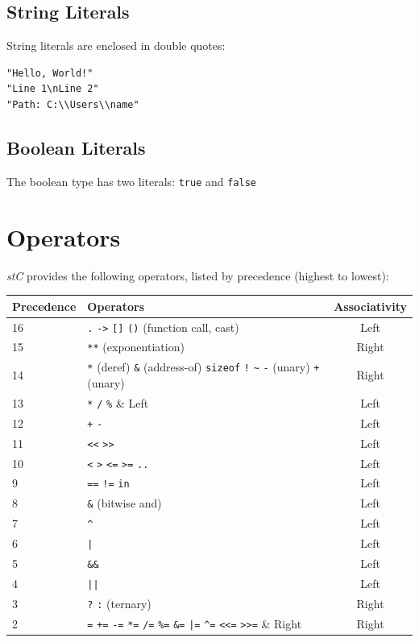 \documentclass[11pt,letterpaper,twoside,openany]{book}
\begin{document}
\subsection{String Literals}
String literals are enclosed in double quotes:
\begin{lstlisting}
"Hello, World!"
"Line 1\nLine 2"
"Path: C:\\Users\\name"
\end{lstlisting}

\subsection{Boolean Literals}
The boolean type has two literals: \verb'true' and \verb'false'

\section{Operators}
\emph{stC} provides the following operators, listed by precedence (highest to lowest):

\begin{center}
\begin{tabular}{|l|l|c|}
\hline
\textbf{Precedence} & \textbf{Operators} & \textbf{Associativity} \\
\hline
16 & \verb'.' \verb'->' \verb'[]' \verb'()' (function call, cast) & Left \\
15 & \verb'**' (exponentiation) & Right \\
14 & \verb'*' (deref) \verb'&' (address-of) \verb'sizeof' \verb'!' \verb'~' \verb'-' (unary) \verb'+' (unary) & Right \\
13 & \verb'*' \verb'/' \verb'%' & Left \\
12 & \verb'+' \verb'-' & Left \\
11 & \verb'<<' \verb'>>' & Left \\
10 & \verb'<' \verb'>' \verb'<=' \verb'>=' \verb'..' & Left \\
9 & \verb'==' \verb'!=' \verb'in' & Left \\
8 & \verb'&' (bitwise and) & Left \\
7 & \verb'^' & Left \\
6 & \verb'|' & Left \\
5 & \verb'&&' & Left \\
4 & \verb'||' & Left \\
3 & \verb'?' \verb':' (ternary) & Right \\
2 & \verb'=' \verb'+=' \verb'-=' \verb'*=' \verb'/=' \verb'%=' \verb'&=' \verb'|=' \verb'^=' \verb'<<=' \verb'>>=' & Right \\
\hline
\end{tabular}
\end{center}
\end{document}
